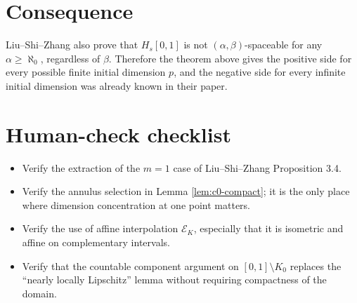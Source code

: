 \documentclass[11pt]{article}
\newcommand{\cE}{\mathcal E}
\begin{document}
\section*{Consequence}

Liu--Shi--Zhang also prove that \(H_s[0,1]\) is not \((\alpha,\beta)\)-spaceable for any \(\alpha\geq\aleph_0\), regardless of \(\beta\).  Therefore the theorem above gives the positive side for every possible finite initial dimension \(p\), and the negative side for every infinite initial dimension was already known in their paper.

\section*{Human-check checklist}

\begin{itemize}[leftmargin=*]
\item Verify the extraction of the \(m=1\) case of Liu--Shi--Zhang Proposition 3.4.
\item Verify the annulus selection in Lemma \ref{lem:c0-compact}; it is the only place where dimension concentration at one point matters.
\item Verify the use of affine interpolation \(\cE_K\), especially that it is isometric and affine on complementary intervals.
\item Verify that the countable component argument on \([0,1]\setminus K_0\) replaces the ``nearly locally Lipschitz'' lemma without requiring compactness of the domain.
\end{itemize}
\end{document}
